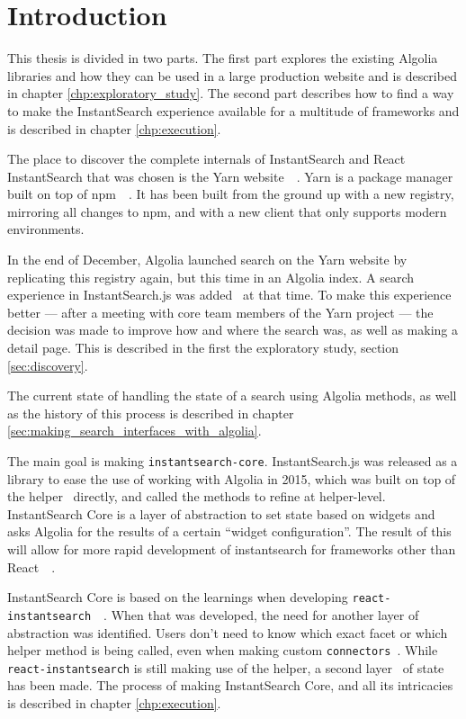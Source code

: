 
\chapter{Introduction} %
\label{chp:introduction}

This thesis is divided in two parts. The first part explores the existing Algolia libraries and how they can be used in a large production website and is described in chapter \ref{chp:exploratory_study}. The second part describes how to find a way to make the InstantSearch experience available for a multitude of frameworks and is described in chapter \ref{chp:execution}.

The place to discover the complete internals of InstantSearch and React InstantSearch that was chosen is the Yarn website~\cite{yarn-site}~. Yarn is a package manager built on top of npm~\cite{npm-github}~. It has been built from the ground up with a new registry, mirroring all changes to npm, and with a new client that only supports modern environments.

In the end of December, Algolia launched search on the Yarn website by replicating this registry again, but this time in an Algolia index. A search experience in InstantSearch.js was added~\cite{yarn-pr-add-algolia} at that time. To make this experience better --- after a meeting with core team members of the Yarn project --- the decision was made to improve how and where the search was, as well as making a detail page. This is described in the first the exploratory study, section \ref{sec:discovery}.

The current state of handling the state of a search using Algolia methods, as well as the history of this process is described in chapter \ref{sec:making_search_interfaces_with_algolia}.

The main goal is making {\tt instantsearch-core}. InstantSearch.js was released as a \gls{library} to ease the use of working with Algolia in 2015, which was built on top of the helper~\cite{algolia-js-helper} directly, and called the methods to refine at helper-level. InstantSearch Core is a layer of abstraction to set state based on widgets and asks Algolia for the results of a certain ``widget configuration''. The result of this will allow for more rapid development of instantsearch for frameworks other than React~\cite{react-doc}~.

InstantSearch Core is based on the learnings when developing {\tt react-instantsearch}~\cite{react-instantsearch}~.  When that was developed, the need for another layer of abstraction was identified. Users don't need to know which exact facet or which helper method is being called, even when making custom {\tt connectors}\cite{react-instantsearch-connectors}~. While {\tt react-instantsearch} is still making use of the helper, a second layer~\cite{react-instantsearch-search-state} of state has been made. The process of making InstantSearch Core, and all its intricacies is described in chapter \ref{chp:execution}.
